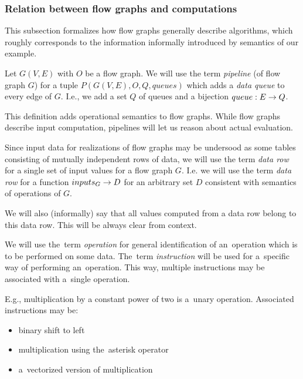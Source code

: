 \subsubsection{Relation between flow graphs and computations}

  This subsection formalizes how flow graphs generally describe algorithms, which roughly corresponds to the information informally introduced by semantics of our example.


\begin{define}
  Let $G(V,E)$ with $O$ be a flow graph. We will use the term \emph{pipeline} (of flow graph $G$) for a tuple $P(G(V,E), O, Q, queues)$ which adds a \emph{data queue} to every edge of $G$. I.e., we add a set $Q$ of queues and a bijection $queue: E \rightarrow Q$. 
\end{define}

This definition adds operational semantics to flow graphs. While flow graphs describe input computation, pipelines will let us reason about actual evaluation.


\begin{define}
  Since input data for realizations of flow graphs may be undersood as some tables consisting of mutually independent rows of data, we will use the term \emph{data row} for a single set of input values for a flow graph $G$. I.e. we will use the term \emph{data row} for a function $inputs_G \rightarrow D$ for an arbitrary set $D$ consistent with semantics of operations of $G$.

  We will also (informally) say that all values computed from a data row belong to this data row. This will be always clear from context.
\end{define}


\begin{define}
We will use the~term \emph{operation} for general identification of an~operation which is to be performed on some data. The~term \emph{instruction} will be used for a~specific way of performing an~operation. This way, multiple instructions may be associated with a~single operation.
\end{define}

E.g., multiplication by a constant power of two is a~unary operation. Associated instructions may be:
\begin{itemize}
  \item binary shift to left
  \item multiplication using the~asterisk operator
  \item a~vectorized version of multiplication
\end{itemize}

